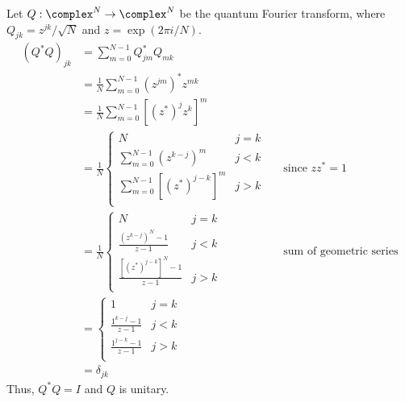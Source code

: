 \begingroup
\newcommand{\expo}[1]{\exp \left( #1 \right)}
%
\par Let $Q : \complex^N \to \complex^N$ be the quantum Fourier transform, where $Q_{jk} = z^{jk} / \sqrt{N}$ and $z = \expo{2 \pi i / N}$.
%
\begin{align*}
\left( Q^* Q \right)_{jk} &= \sum_{m=0}^{N-1}{Q^*_{jm} Q_{mk}} \\
&= \frac1N \sum_{m=0}^{N-1}{\left( z^{jm} \right)^* z^{mk}} \\
&= \frac1N \sum_{m=0}^{N-1}{\left[ \left( z^* \right)^j z^k \right]^m} \\

&= \frac1N \begin{cases}
N & j = k \\
\sum_{m=0}^{N-1}{\left( z^{k-j} \right)^m} & j < k \\
\sum_{m=0}^{N-1}{\left[ \left( z^* \right)^{j-k} \right]^m} & j > k \\
\end{cases} && \text{since $z z^* = 1$} \\

&= \frac1N \begin{cases}
N & j = k \\
\frac{\left( z^{k-j} \right)^N - 1}{z-1} & j < k \\
\frac{\left[ \left( z^* \right)^{j-k} \right]^N - 1}{z-1} & j > k \\
\end{cases} && \text{sum of geometric series} \\

&= \begin{cases}
1 & j = k \\
\frac{1^{k-j} - 1}{z-1} & j < k \\
\frac{1^{j-k} - 1}{z-1} & j > k \\
\end{cases} \\

&= \delta_{jk}
\end{align*}
%
Thus, $Q^* Q = I$ and $Q$ is unitary.
%
\endgroup
